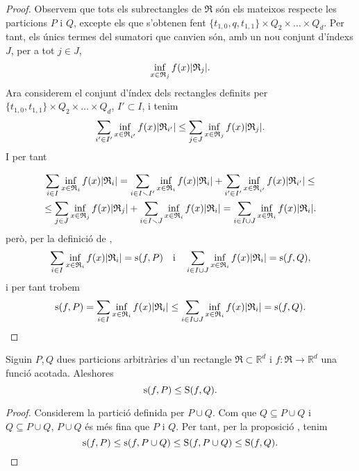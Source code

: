 \documentclass[../Apunts.tex]{subfiles}
\begin{document}
\begin{proposition}
\begin{proof}
			Observem que tots els subrectangles de \(\mathfrak{R}\) són els mateixos respecte les particions \(P\) i \(Q\), excepte els que s'obtenen fent \(\{t_{1,0},q,t_{1,1}\}\times Q_{2}\times\dots\times Q_{d}\). Per tant, els únics termes del sumatori que canvien són, amb un nou conjunt d'índexs \(J\), per a tot \(j\in J\),
			\[\inf_{x\in \mathfrak{R}_{j}}f(x)\abs{\mathfrak{R}_{j}}.\]
			Ara considerem el conjunt d'índex dels rectangles definits per \(\{t_{1,0},t_{1,1}\}\times Q_{2}\times\dots\times Q_{d}\), \(I'\subset I\), i tenim
			\[\sum_{i'\in I'}\inf_{x\in \mathfrak{R}_{i'}}f(x)\abs{\mathfrak{R}_{i'}}\leq\sum_{j\in J}\inf_{x\in \mathfrak{R}_{j}}f(x)\abs{\mathfrak{R}_{j}}.\]
			I per tant%
				\begin{comment}
					\marginpar{Cut my life into pieces\\
					This is my last resort\\
					Suffocation\hfil\twonotes\hfil\\
					No breathing\\
					Don't give a fuck\\
					if I cut my arm, bleeding}
				\end{comment}
			\begin{multline*}
			\sum_{i\in I}\inf_{x\in \mathfrak{R}_{i}}f(x)\abs{\mathfrak{R}_{i}}=
			\sum_{i\in I\smallsetminus I'}\inf_{x\in \mathfrak{R}_{i}}f(x)\abs{\mathfrak{R}_{i}}+\sum_{i'\in I'}\inf_{x\in \mathfrak{R}_{i'}}f(x)\abs{\mathfrak{R}_{i'}}\leq\\
			\leq\sum_{j\in J}\inf_{x\in \mathfrak{R}_{j}}f(x)\abs{\mathfrak{R}_{j}}+\sum_{i\in I\smallsetminus J}\inf_{x\in \mathfrak{R}_{i}}f(x)\abs{\mathfrak{R}_{i}}
			=\sum_{i\in I\cup J}\inf_{x\in \mathfrak{R}_{i}}f(x)\abs{\mathfrak{R}_{i}}.
			\end{multline*}
			però, per la definició de ,
			\[\sum_{i\in I}\inf_{x\in \mathfrak{R}_{i}}f(x)\abs{\mathfrak{R}_{i}}=\sinf(f,P)\quad\text{i}\quad\sum_{i\in I\cup J}\inf_{x\in \mathfrak{R}_{i}}f(x)\abs{\mathfrak{R}_{i}}=\sinf(f,Q),\]
			i per tant trobem
			\[\sinf(f,P)=\sum_{i\in I}\inf_{x\in \mathfrak{R}_{i}}f(x)\abs{\mathfrak{R}_{i}}\leq\sum_{i\in I\cup J}\inf_{x\in \mathfrak{R}_{i}}f(x)\abs{\mathfrak{R}_{i}}=\sinf(f,Q).\qedhere\]
		\end{proof}
	\end{proposition}
	\begin{proposition}
		\label{prop:Sumes i finor de particions}
		Siguin \(P,Q\) dues particions arbitràries d'un rectangle \(\mathfrak{R}\subset\mathbb{R}^{d}\) i \(f\colon\mathfrak{R}\to\mathbb{R}^{d}\) una funció acotada. Aleshores
		\[\operatorname{s}(f,P)\leq\operatorname{S}(f,Q).\]
		\begin{proof}
			Considerem la partició definida per \(P\cup Q\). Com que \(Q\subseteq P\cup Q\) i \(Q\subseteq P\cup Q\), \(P\cup Q\) és més fina que \(P\) i \(Q\). Per tant, per la proposició , tenim
			\[\operatorname{s}(f,P)\leq\operatorname{s}(f,P\cup Q)\leq\operatorname{S}(f,P\cup Q)\leq\operatorname{S}(f,Q).\qedhere\]
		\end{proof}
	\end{proposition}
\end{document}
